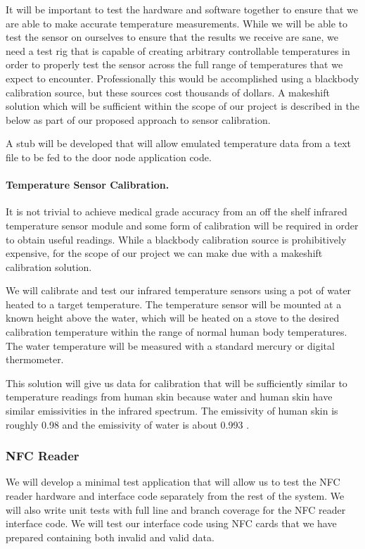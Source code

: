 It will be important to test the hardware and software together to ensure that
we are able to make accurate temperature measurements. While we will be able to
test the sensor on ourselves to ensure that the results we receive are sane, we
need a test rig that is capable of creating arbitrary controllable temperatures
in order to properly test the sensor across the full range of temperatures that
we expect to encounter. Professionally this would be accomplished using a
blackbody calibration source, but these sources cost thousands of dollars. A
makeshift solution which will be sufficient within the scope of our project is
described in the below as part of our proposed approach to sensor calibration.

A stub will be developed that will allow emulated temperature data from a text
file to be fed to the door node application code.

\paragraph{Temperature Sensor Calibration.}
It is not trivial to achieve medical grade accuracy from an off the shelf
infrared temperature sensor module and some form of calibration will be required
in order to obtain useful readings. While a blackbody calibration source is
prohibitively expensive, for the scope of our project we can make due with a
makeshift calibration solution.

We will calibrate and test our infrared temperature sensors using a pot of water
heated to a target temperature. The temperature sensor will be mounted at a
known height above the water, which will be heated on a stove to the desired
calibration temperature within the range of normal human body temperatures.
The water temperature will be measured with a standard mercury or digital
thermometer.

This solution will give us data for calibration that will be sufficiently
similar to temperature readings from human skin because water and human skin
have similar emissivities in the infrared spectrum. The emissivity of human skin
is roughly 0.98 \cite{Steketee_1973} and the emissivity of water is about 0.993
\cite{Buettner_1965}.

\subsubsection{NFC Reader}

We will develop a minimal test application that will allow us to test the NFC
reader hardware and interface code separately from the rest of the system. We
will also write unit tests with full line and branch coverage for the NFC reader
interface code. We will test our interface code using NFC cards that we have
prepared containing both invalid and valid data.

